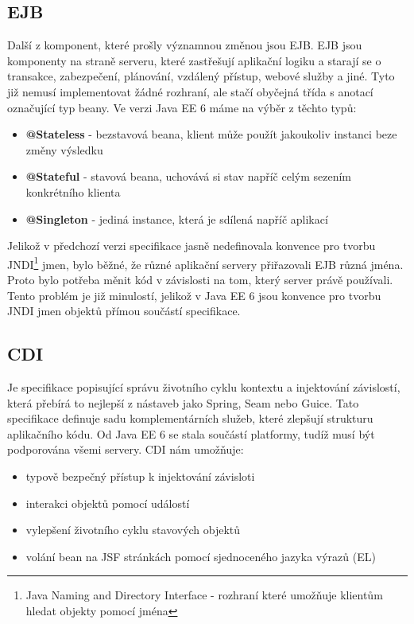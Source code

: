 \documentclass[122pt,oneside]{fithesis}
\begin{document}
\subsection{EJB}
Další z komponent, které prošly významnou změnou jsou EJB. EJB jsou komponenty na straně serveru, které zastřešují aplikační logiku a starají se o transakce, zabezpečení, plánování, vzdálený přístup, webové služby a jiné. Tyto již nemusí implementovat žádné rozhraní, ale stačí obyčejná třída s anotací označující typ beany. Ve verzi Java EE 6 máme na výběr z těchto typů:

\begin{itemize}
  \item {\bf @Stateless} - bezstavová beana, klient může použít jakoukoliv instanci beze změny výsledku
  \item {\bf @Stateful} - stavová beana, uchovává si stav napříč celým sezením konkrétního klienta
  \item {\bf @Singleton} - jediná instance, která je sdílená napříč aplikací
\end{itemize}

Jelikož v předchozí verzi specifikace jasně nedefinovala konvence pro tvorbu JNDI\footnote{Java Naming and Directory Interface - rozhraní které umožňuje klientům hledat objekty pomocí jména} jmen, bylo běžné, že různé aplikační servery přiřazovali EJB různá jména. Proto bylo potřeba měnit kód v závislosti na tom, který server právě používali. Tento problém je již minulostí, jelikož v Java EE 6 jsou konvence pro tvorbu JNDI jmen objektů přímou součástí specifikace.

\subsection{CDI}
Je specifikace popisující správu životního cyklu kontextu a injektování závislostí, která přebírá to nejlepší z nástaveb jako Spring, Seam nebo Guice. Tato specifikace definuje sadu komplementárních služeb, které zlepšují strukturu aplikačního kódu. Od Java EE 6 se stala součástí platformy, tudíž musí být podporována všemi servery. CDI nám umožňuje:

\begin{itemize}
  \item typově bezpečný přístup k injektování závisloti
  \item interakci objektů pomocí událostí
  \item vylepšení životního cyklu stavových objektů
  \item volání bean na JSF stránkách pomocí sjednoceného jazyka výrazů (EL)
\end{itemize}
\end{document}
